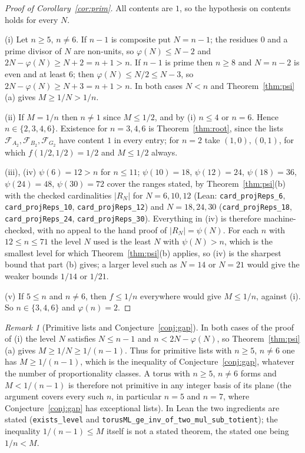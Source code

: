 \documentclass[11pt]{amsart}
\theoremstyle{definition}
\theoremstyle{remark}
\newtheorem{remark}[theorem]{Remark}
\newcommand{\lean}[1]{\texttt{#1}}
\begin{document}
\begin{proof}[Proof of Corollary~\ref{cor:prim}]
All contents are $1$, so the hypothesis on contents holds for every $N$.

(i) Let $n\ge5$, $n\ne6$. If $n-1$ is composite put $N=n-1$; the residues $0$ and a prime divisor of $N$ are non-units, so $\varphi(N)\le N-2$ and $2N-\varphi(N)\ge N+2=n+1>n$. If $n-1$ is prime then $n\ge8$ and $N=n-2$ is even and at least $6$; then $\varphi(N)\le N/2\le N-3$, so $2N-\varphi(N)\ge N+3=n+1>n$. In both cases $N<n$ and Theorem~\ref{thm:psi}(a) gives $M\ge1/N>1/n$.

(ii) If $M=1/n$ then $n\ne1$ since $M\le1/2$, and by (i) $n\le4$ or $n=6$. Hence $n\in\{2,3,4,6\}$. Existence for $n=3,4,6$ is Theorem~\ref{thm:root}, since the lists $\mathcal F_{A_2},\mathcal F_{B_2},\mathcal F_{G_2}$ have content $1$ in every entry; for $n=2$ take $(1,0),(0,1)$, for which $f(1/2,1/2)=1/2$ and $M\le1/2$ always.

(iii), (iv) $\psi(6)=12>n$ for $n\le11$; $\psi(10)=18$, $\psi(12)=24$, $\psi(18)=36$, $\psi(24)=48$, $\psi(30)=72$ cover the ranges stated, by Theorem~\ref{thm:psi}(b) with the checked cardinalities $|R_N|$ for $N=6,10,12$ (Lean: \lean{card\_projReps\_6}, \lean{card\_projReps\_10}, \lean{card\_projReps\_12}) and $N=18,24,30$ (\lean{card\_projReps\_18}, \lean{card\_projReps\_24}, \lean{card\_projReps\_30}). Everything in (iv) is therefore machine-checked, with no appeal to the hand proof of $|R_N|=\psi(N)$. For each $n$ with $12\le n\le71$ the level $N$ used is the least $N$ with $\psi(N)>n$, which is the smallest level for which Theorem~\ref{thm:psi}(b) applies, so (iv) is the sharpest bound that part (b) gives; a larger level such as $N=14$ or $N=21$ would give the weaker bounds $1/14$ or $1/21$.

(v) If $5\le n$ and $n\ne6$, then $f\le1/n$ everywhere would give $M\le1/n$, against (i). So $n\in\{3,4,6\}$ and $\varphi(n)=2$.
\end{proof}

\begin{remark}[Primitive lists and Conjecture~\ref{conj:gap}]\label{rem:primconj}
In both cases of the proof of (i) the level $N$ satisfies $N\le n-1$ and $n<2N-\varphi(N)$, so Theorem~\ref{thm:psi}(a) gives $M\ge1/N\ge1/(n-1)$. Thus for primitive lists with $n\ge5$, $n\ne6$ one has $M\ge1/(n-1)$, which is the inequality of Conjecture~\ref{conj:gap}, whatever the number of proportionality classes. A torus with $n\ge5$, $n\ne6$ forms and $M<1/(n-1)$ is therefore not primitive in any integer basis of its plane (the argument covers every such $n$, in particular $n=5$ and $n=7$, where Conjecture~\ref{conj:gap} has exceptional lists). In Lean the two ingredients are stated (\lean{exists\_level} and \lean{torusML\_ge\_inv\_of\_two\_mul\_sub\_totient}); the inequality $1/(n-1)\le M$ itself is not a stated theorem, the stated one being $1/n<M$.
\end{remark}
\end{document}
